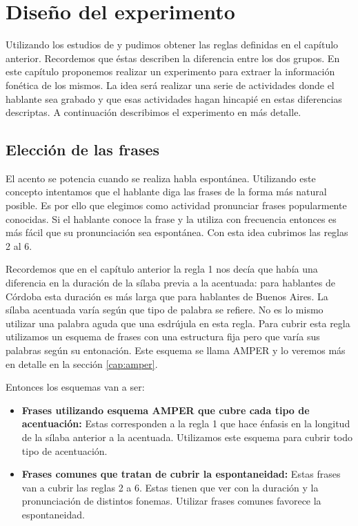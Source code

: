 \chapter{Diseño del experimento}

Utilizando los estudios de \cite{Fontanella2000} y  \cite{Vidal1964} pudimos obtener las reglas definidas en el capítulo anterior. Recordemos que éstas describen la diferencia entre los dos grupos. En este capítulo proponemos realizar un experimento para extraer la información fonética de los mismos. La idea será realizar una serie de actividades donde el hablante sea grabado y que esas actividades hagan hincapié en estas diferencias descriptas. A continuación describimos el experimento en más detalle.

\section{Elección de las frases}

El acento se potencia cuando se realiza habla espontánea. Utilizando este concepto intentamos que el hablante diga las frases de la forma más natural posible. Es por ello que elegimos como actividad pronunciar frases popularmente conocidas. Si el hablante conoce la frase y la utiliza con frecuencia entonces es más fácil que su pronunciación sea espontánea. Con esta idea cubrimos las reglas 2 al 6. 

Recordemos que en el capítulo anterior la regla 1 nos decía que había una diferencia en la duración de la sílaba previa a la acentuada: para hablantes de Córdoba esta duración es más larga que para hablantes de Buenos Aires. La sílaba acentuada varía según que tipo de palabra se refiere. No es lo mismo utilizar una palabra aguda que una esdrújula en esta regla. Para cubrir esta regla utilizamos un esquema de frases con una estructura fija pero que varía sus palabras según su entonación. Este esquema se llama AMPER \cite{amper2004,amper} y lo veremos más en detalle en la sección \ref{cap:amper}.

Entonces los esquemas van a ser: 

\begin{itemize}
  \item \textbf{Frases utilizando esquema AMPER que cubre cada tipo de acentuación:} Estas corresponden a la regla 1 que hace énfasis en la longitud de la sílaba anterior a la acentuada. Utilizamos este esquema para cubrir todo tipo de acentuación.
  \item \textbf{Frases comunes que tratan de cubrir la espontaneidad:} Estas frases van a cubrir las reglas 2 a 6. Estas tienen que ver con la duración y la pronunciación de distintos fonemas. Utilizar frases comunes favorece la espontaneidad.
\end{itemize}

